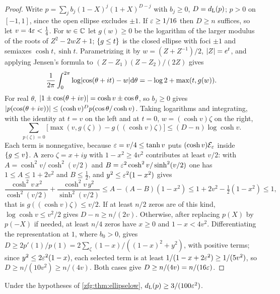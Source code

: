 \begin{proof}
Write $p=\sum_jb_j(1-X)^j(1+X)^{D-j}$ with $b_j\ge0$, $D=d_{\mathrm L}(p)$; $p>0$ on $[-1,1]$, since the open ellipse excludes $\pm1$. If
$\varepsilon\ge1/16$ then $D\ge n$ suffices, so let $v=4\varepsilon<\tfrac14$. For $w\in\mathbb{C}$ let $g(w)\ge0$ be the logarithm of the larger modulus of
the roots of $Z^2-2wZ+1$; $\{g\le t\}$ is the closed ellipse with foci $\pm1$ and semiaxes $\cosh t,\sinh t$. Parametrizing it by
$w=(Z+Z^{-1})/2$, $\lvert Z\rvert=e^t$, and applying Jensen's formula to $(Z-Z_1)(Z-Z_2)/(2Z)$ gives
\[
 \frac1{2\pi}\int_0^{2\pi}\log\lvert\cos(\theta+it)-w\rvert\mathrm{d}\theta=-\log2+\max(t,g(w)).
\]
For real $\theta$, $\lvert1\pm\cos(\theta+iv)\rvert=\cosh v\pm\cos\theta$, so $b_j\ge0$ gives $\lvert p(\cos(\theta+iv))\rvert\le(\cosh v)^Dp(\cos\theta/\cosh v)$.
Taking logarithms and integrating, with the identity at $t=v$ on the left and at $t=0$, $w=(\cosh v)\zeta$ on the right,
\[
 \sum_{p(\zeta)=0}\bigl[\max(v,g(\zeta))-g((\cosh v)\zeta)\bigr]\le(D-n)\log\cosh v .
\]
Each term is nonnegative, because $\varepsilon=v/4\le\tanh v$ puts $(\cosh v)\mathcal E_\varepsilon$ inside $\{g\le v\}$. A zero $\zeta=x+iy$ with $1-x^2\ge4v^2$
contributes at least $v/2$: with $A=\cosh^2v/\cosh^2(v/2)$ and $B=\varepsilon^2\cosh^2v/\sinh^2(v/2)$ one has $1\le A\le1+2v^2$ and $B\le\tfrac12$, and
$y^2\le\varepsilon^2(1-x^2)$ gives
\[
 \frac{\cosh^2v\,x^2}{\cosh^2(v/2)}+\frac{\cosh^2v\,y^2}{\sinh^2(v/2)}\le A-(A-B)(1-x^2)\le1+2v^2-\tfrac12(1-x^2)\le1,
\]
that is $g((\cosh v)\zeta)\le v/2$. If at least $n/2$ zeros are of this kind, $\log\cosh v\le v^2/2$ gives $D-n\ge n/(2v)$. Otherwise,
after replacing $p(X)$ by $p(-X)$ if needed, at least $n/4$ zeros have $x\ge0$ and $1-x<4v^2$. Differentiating the
representation at $1$, where $b_0>0$, gives $D\ge2p'(1)/p(1)=2\sum_\zeta(1-x)/((1-x)^2+y^2)$, with positive terms; since
$y^2\le2\varepsilon^2(1-x)$, each selected term is at least $1/(1-x+2\varepsilon^2)\ge1/(5v^2)$, so $D\ge n/(10v^2)\ge n/(4v)$. Both cases give
$D\ge n/(4v)=n/(16\varepsilon)$.
\end{proof}

\begin{theorem}\label{zfg:thm:ellipsewidth}
Under the hypotheses of \cref{zfg:thm:ellipselow}, $d_{\mathrm L}(p)\ge3/(100\varepsilon^2)$.
\end{theorem}

